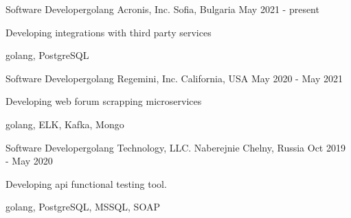 

\begin{cventries}


  \cventry
    {Software Developer{\enskip\cdotp\enskip}golang} %
    {Acronis, Inc.} %
    {Sofia, Bulgaria} %
    {May 2021 - present} %
    {
      \begin{cvitems} %
        \item {Developing integrations with third party services}
        \item {golang, PostgreSQL}
      \end{cvitems}
    }
    
  \cventry
    {Software Developer{\enskip\cdotp\enskip}golang} %
    {Regemini, Inc.} %
    {California, USA} %
    {May 2020 - May 2021} %
    {
      \begin{cvitems} %
        \item {Developing web forum scrapping microservices}
        \item {golang, ELK, Kafka, Mongo}
      \end{cvitems}
    }

  \cventry
    {Software Developer{\enskip\cdotp\enskip}golang} %
    {Technology, LLC.} %
    {Naberejnie Chelny, Russia} %
    {Oct 2019 - May 2020} %
    {
      \begin{cvitems} %
        \item {Developing api functional testing tool.}
        \item {golang, PostgreSQL, MSSQL, SOAP}
      \end{cvitems}
    }


\end{cventries}
